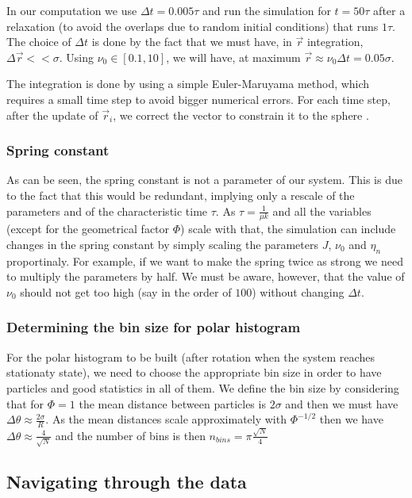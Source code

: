 \documentclass[12pt]{article}
\begin{document}
In our computation we use $\Delta t = 0.005 \tau$ and run the simulation for $t=50 \tau$ after a relaxation (to avoid the overlaps due to random initial conditions) that runs $1 \tau$. The choice of $\Delta t$ is done by the fact that we must have, in $\vec{r}$ integration, $\Delta \vec{r} << \sigma$. Using $\nu_0 \in [0.1, 10]$, we will have, at maximum $\vec{r} \approx \nu_0 \Delta t = 0.05 \sigma$.

The integration is done by using a simple Euler-Maruyama method, which requires a small time step to avoid bigger numerical errors. For each time step, after the update of $\vec{r}_i$, we correct the vector to constrain it to the sphere \cite{Sknepnek2014}.

\subsubsection{Spring constant}

As can be seen, the spring constant is not a parameter of our system. This is due to the fact that this would be redundant, implying only a rescale of the parameters and of the characteristic time $\tau$. As $\tau = \frac{1}{\mu k}$ and all the variables (except for the geometrical factor $\Phi$) scale with that, the simulation can include changes in the spring constant by simply scaling the parameters $J$, $\nu_0$ and $\eta_n$ proportinaly. For example, if we want to make the spring twice as strong we need to multiply the parameters by half. We must be aware, however, that the value of $\nu_0$ should not get too high (say in the order of $100$) without changing $\Delta t$.

\subsubsection{Determining the bin size for polar histogram}

For the polar histogram to be built (after rotation when the system reaches stationaty state), we need to choose the appropriate bin size in order to have particles and good statistics in all of them. We define the bin size by considering that for $\Phi=1$ the mean distance between particles is $2\sigma$ and then we must have $\Delta \theta \approx \frac{2\sigma}{R}$. As the mean distances scale approximately with $\Phi^{-1/2}$ then we have $\Delta \theta \approx \frac{4}{\sqrt{N}}$ and the number of bins is then $n_{bins} = \pi \frac{\sqrt{N}}{4}$

\subsection{Navigating through the data}


\end{document}
